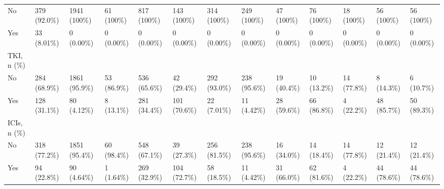 \begin{landscape}
\begin{center}
\begin{longtable}{p{5.2cm}p{3.0cm}}
No & 379 (92.0\%) & 1941 (100\%) & 61 (100\%) & 817 (100\%) & 143 (100\%) & 314 (100\%) & 249 (100\%) & 47 (100\%) & 76 (100\%) & 18 (100\%) & 56 (100\%) & 56 (100\%) \\
Yes & 33 (8.01\%) & 0 (0.00\%) & 0 (0.00\%) & 0 (0.00\%) & 0 (0.00\%) & 0 (0.00\%) & 0 (0.00\%) & 0 (0.00\%) & 0 (0.00\%) & 0 (0.00\%) & 0 (0.00\%) & 0 (0.00\%) \\
TKI, n (\%) &  &  &  &  &  &  &  &  &  &  &  &  \\
No & 284 (68.9\%) & 1861 (95.9\%) & 53 (86.9\%) & 536 (65.6\%) & 42 (29.4\%) & 292 (93.0\%) & 238 (95.6\%) & 19 (40.4\%) & 10 (13.2\%) & 14 (77.8\%) & 8 (14.3\%) & 6 (10.7\%) \\
Yes & 128 (31.1\%) & 80 (4.12\%) & 8 (13.1\%) & 281 (34.4\%) & 101 (70.6\%) & 22 (7.01\%) & 11 (4.42\%) & 28 (59.6\%) & 66 (86.8\%) & 4 (22.2\%) & 48 (85.7\%) & 50 (89.3\%) \\
ICIs, n (\%) &  &  &  &  &  &  &  &  &  &  &  &  \\
No & 318 (77.2\%) & 1851 (95.4\%) & 60 (98.4\%) & 548 (67.1\%) & 39 (27.3\%) & 256 (81.5\%) & 238 (95.6\%) & 16 (34.0\%) & 14 (18.4\%) & 14 (77.8\%) & 12 (21.4\%) & 12 (21.4\%) \\
Yes & 94 (22.8\%) & 90 (4.64\%) & 1 (1.64\%) & 269 (32.9\%) & 104 (72.7\%) & 58 (18.5\%) & 11 (4.42\%) & 31 (66.0\%) & 62 (81.6\%) & 4 (22.2\%) & 44 (78.6\%) & 44 (78.6\%) \\

    \end{longtable}
    \end{center}
    \end{landscape}
